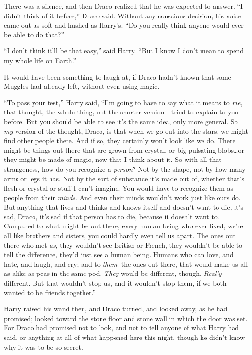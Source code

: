 There was a silence, and then Draco realized that he was expected to answer. “I didn’t think of it before,” Draco said. Without any conscious decision, his voice came out as soft and hushed as Harry’s. “Do you really think anyone would ever be able to do that?”

“I don’t think it’ll be that easy,” said Harry. “But I know I don’t mean to spend my whole life on Earth.”

It would have been something to laugh at, if Draco hadn’t known that some Muggles had already left, without even using magic.

“To pass your test,” Harry said, “I’m going to have to say what it means to \emph{me}, that thought, the whole thing, not the shorter version I tried to explain to you before. But you should be able to see it’s the same idea, only more general. So \emph{my} version of the thought, Draco, is that when we go out into the stars, we might find other people there. And if so, they certainly won’t look like we do. There might be things out there that are grown from crystal, or big pulsating blobs…or they might be made of magic, now that I think about it. So with all that strangeness, how do you recognize a \emph{person}? Not by the shape, not by how many arms or legs it has. Not by the sort of substance it’s made out of, whether that’s flesh or crystal or stuff I can’t imagine. You would have to recognize them as people from their \emph{minds}. And even their minds wouldn’t work just like ours do. But anything that lives and thinks and knows itself and doesn’t want to die, it’s sad, Draco, it’s sad if that person has to die, because it doesn’t want to. Compared to what might be out there, every human being who ever lived, we’re all like brothers and sisters, you could hardly even tell us apart. The ones out there who met \emph{us}, they wouldn’t see British or French, they wouldn’t be able to tell the difference, they’d just see a human being. Humans who can love, and hate, and laugh, and cry; and to \emph{them}, the ones out there, that would make us all as alike as peas in the same pod. \emph{They} would be different, though. \emph{Really} different. But that wouldn’t stop us, and it wouldn’t stop them, if we both wanted to be friends together.”

Harry raised his wand then, and Draco turned, and looked away, as he had promised; looked toward the stone floor and stone wall in which the door was set. For Draco had promised not to look, and not to tell anyone of what Harry had said, or anything at all of what happened here this night, though he didn’t know why it was to be so secret.


